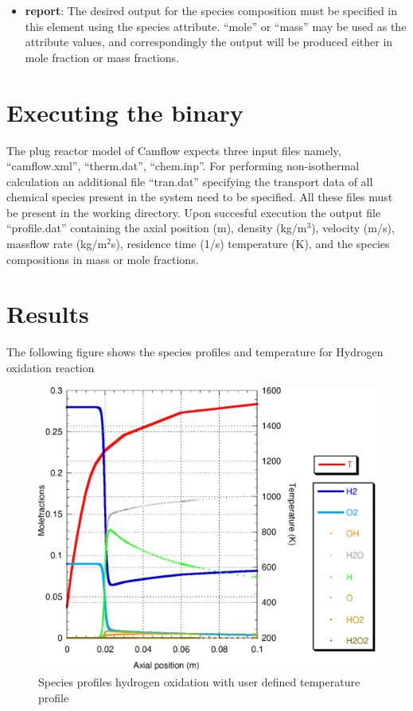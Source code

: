 \begin{itemize}
\item \textbf{report}: The desired output for the species composition must be specified in this element using the species attribute. ``mole'' or ``mass'' may be used as the attribute values, and correspondingly the output will be produced either in mole fraction or mass fractions.

\end{itemize}

\section{Executing the binary}
The plug reactor model of Camflow expects three input files namely, ``camflow.xml'', ``therm.dat'',  ``chem.inp''. For performing non-isothermal calculation an additional file ``tran.dat'' specifying the transport data of all chemical species present in the system need to be specified. All these files must be present in the working directory. Upon succesful execution the output file ``profile.dat'' containing the axial position (m), density (kg/m$^3$), velocity (m/s), massflow rate (kg/m$^2$s), residence time (1/s) temperature (K), and the species compositions in mass or mole fractions.

\section{Results}
The following figure shows the species profiles and temperature for Hydrogen oxidation reaction 
\begin{figure}[h]
 \centering
\includegraphics[scale=0.6]{plug_profile.eps}
\caption{Species profiles hydrogen oxidation with user defined temperature profile}
\end{figure}

%
%
%


